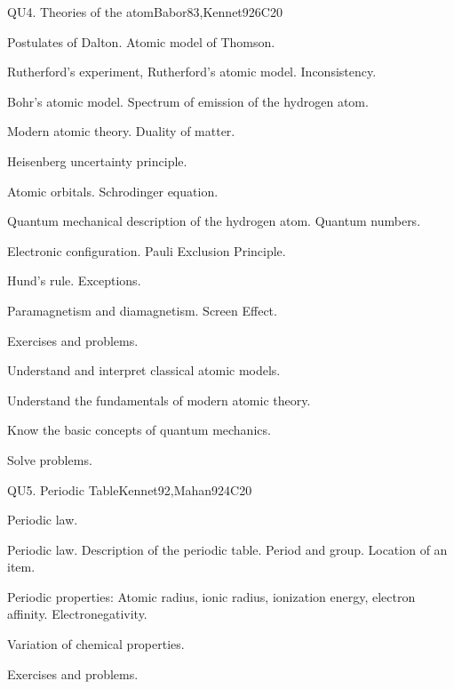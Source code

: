 \begin{syllabus}
\begin{unit}{QU4. Theories of the atom}{}{Babor83,Kennet92}{6}{C20}
\begin{topics}
      \item Postulates of Dalton. Atomic model of Thomson.
      \item Rutherford's experiment, Rutherford's atomic model. Inconsistency.
      \item Bohr's atomic model. Spectrum of emission of the hydrogen atom.
      \item Modern atomic theory. Duality of matter.
      \item Heisenberg uncertainty principle.
      \item Atomic orbitals. Schrodinger equation.
      \item Quantum mechanical description of the hydrogen atom. Quantum numbers.
      \item Electronic configuration. Pauli Exclusion Principle.
      \item Hund's rule. Exceptions.
      \item Paramagnetism and diamagnetism. Screen Effect.
      \item Exercises and problems.
   \end{topics}

   \begin{learningoutcomes}
      \item Understand and interpret classical atomic models.
      \item Understand the fundamentals of modern atomic theory.
      \item Know the basic concepts of quantum mechanics.
      \item Solve problems.

   \end{learningoutcomes}
\end{unit}

\begin{unit}{QU5. Periodic Table}{Kennet92,Mahan92}{}{4}{C20}
\begin{topics}	
	\item Periodic law.
	\item Periodic law. Description of the periodic table. Period and group. Location of an item.
	\item Periodic properties: Atomic radius, ionic radius, ionization energy, electron affinity. Electronegativity.
	\item Variation of chemical properties.
	\item Exercises and problems.


\end{topics}
\end{unit}
\end{syllabus}
